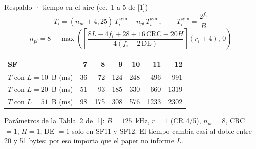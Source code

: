 \documentclass[aspectratio=169,11pt]{beamer}
\begin{document}
\begin{frame}{Respaldo · tiempo en el aire (ec.~1 a 5 de [1])}
  \vspace{1mm}
  \[
    T_i=(n_{pr}+4{,}25)\,T^{\mathrm{sym}}_i+n_{pl}\,T^{\mathrm{sym}}_i,\qquad T^{\mathrm{sym}}_i=\frac{2^{f_i}}{B}
  \]
  \[
    n_{pl}=8+\max\!\left(\left\lceil\frac{8L-4f_i+28+16\,\mathrm{CRC}-20H}{4(f_i-2\,\mathrm{DE})}\right\rceil(r_i+4),\,0\right)
  \]
  \vspace{1mm}
  \begin{center}
  \small
  \begin{tabular}{@{}lrrrrrr@{}}
    \toprule
    SF & 7 & 8 & 9 & 10 & 11 & 12 \\ \midrule
    $T$ con $L=10$~B (ms) & 36 & 72 & 124 & 248 & 496 & 991 \\
    $T$ con $L=20$~B (ms) & 51 & 93 & 185 & 330 & 660 & 1319 \\
    $T$ con $L=51$~B (ms) & 98 & 175 & 308 & 576 & 1233 & 2302 \\ \bottomrule
  \end{tabular}
  \end{center}
  {\scriptsize\textcolor{muted}{Parámetros de la Tabla~2 de [1]: $B=125$~kHz, $r=1$ (CR 4/5), $n_{pr}=8$, CRC $=1$, $H=1$, DE $=1$ solo en SF11 y SF12.
  El tiempo cambia casi al doble entre 20 y 51 bytes: por eso importa que el paper no informe $L$.}}
\end{frame}
\end{document}
